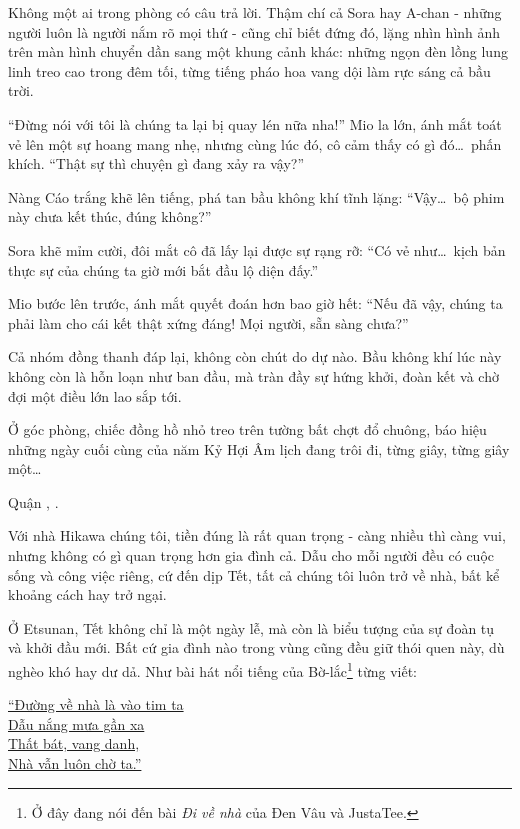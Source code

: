 \documentclass[../main.tex]{subfiles}
\begin{document}
Không một ai trong phòng có câu trả lời. Thậm chí cả Sora hay A-chan - những người luôn là người nắm rõ mọi thứ - cũng chỉ biết đứng đó, lặng nhìn hình ảnh trên màn hình chuyển dần sang một khung cảnh khác: những ngọn đèn lồng lung linh treo cao trong đêm tối, từng tiếng pháo hoa vang dội làm rực sáng cả bầu trời.

``Đừng nói với tôi là chúng ta lại bị quay lén nữa nha!'' Mio la lớn, ánh mắt toát vẻ lên một sự hoang mang nhẹ, nhưng cùng lúc đó, cô cảm thấy có gì đó\dots\ phấn khích. ``Thật sự thì chuyện gì đang xảy ra vậy?''

Nàng Cáo trắng khẽ lên tiếng, phá tan bầu không khí tĩnh lặng: ``Vậy\dots\ bộ phim này chưa kết thúc, đúng không?''

Sora khẽ mỉm cười, đôi mắt cô đã lấy lại được sự rạng rỡ: ``Có vẻ như\dots\ kịch bản thực sự của chúng ta giờ mới bắt đầu lộ diện đấy.''

Mio bước lên trước, ánh mắt quyết đoán hơn bao giờ hết: ``Nếu đã vậy, chúng ta phải làm cho cái kết thật xứng đáng! Mọi người, sẵn sàng chưa?''

Cả nhóm đồng thanh đáp lại, không còn chút do dự nào. Bầu không khí lúc này không còn là hỗn loạn như ban đầu, mà tràn đầy sự hứng khởi, đoàn kết và chờ đợi một điều lớn lao sắp tới.

Ở góc phòng, chiếc đồng hồ nhỏ treo trên tường bất chợt đổ chuông, báo hiệu những ngày cuối cùng của năm Kỷ Hợi Âm lịch đang trôi đi, từng giây, từng giây một\dots

\omk

\begin{center}
  Quận , .
\end{center}

Với nhà Hikawa chúng tôi, tiền đúng là rất quan trọng - càng nhiều thì càng vui, nhưng không có gì quan trọng hơn gia đình cả. Dẫu cho mỗi người đều có cuộc sống và công việc riêng, cứ đến dịp Tết, tất cả chúng tôi luôn trở về nhà, bất kể khoảng cách hay trở ngại.

Ở Etsunan, Tết không chỉ là một ngày lễ, mà còn là biểu tượng của sự đoàn tụ và khởi đầu mới. Bất cứ gia đình nào trong vùng cũng đều giữ thói quen này, dù nghèo khó hay dư dả. Như bài hát nổi tiếng của Bờ-lắc\footnote{Ở đây đang nói đến bài \textit{Đi về nhà} của Đen Vâu và JustaTee.} từng viết:

\hyperlink{https://www.youtube.com/watch?v=vTJdVE_gjI0}{
  \tabs[6cm] ``Đường về nhà là vào tim ta \\
  \tabs[6cm] Dẫu nắng mưa gần xa \\
  \tabs[6cm] Thất bát, vang danh, \\
  \tabs[6cm] Nhà vẫn luôn chờ ta.''}
\end{document}
